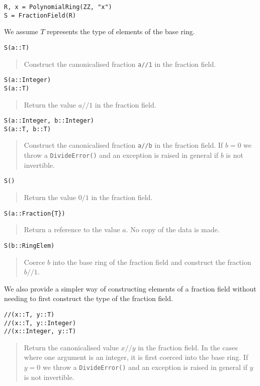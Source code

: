 \documentclass[a4paper,10pt]{article}
\newcommand{\code}{\lstinline}
\newcommand{\desc}[1]{\vspace{-3mm}\begin{quote}#1\end{quote}}
\begin{document}
\begin{lstlisting}
R, x = PolynomialRing(ZZ, "x")
S = FractionField(R)
\end{lstlisting}

We assume $T$ represents the type of elements of the base ring.

\begin{lstlisting}
S(a::T)
\end{lstlisting}

\desc{Construct the canonicalised fraction \code{a//1} in the fraction field.}

\begin{lstlisting}
S(a::Integer)
S(a::T)
\end{lstlisting}

\desc{Return the value $a//1$ in the fraction field.}

\begin{lstlisting}
S(a::Integer, b::Integer)
S(a::T, b::T)
\end{lstlisting}

\desc{Construct the canonicalised fraction \code{a//b} in the fraction field. If
$b = 0$ we throw a \code{DivideError()} and an exception is raised in general
if $b$ is not invertible.}

\begin{lstlisting}
S()
\end{lstlisting}

\desc{Return the value $0/1$ in the fraction field.}

\begin{lstlisting}
S(a::Fraction{T})
\end{lstlisting}

\desc{Return a reference to the value $a$. No copy of the data is made.}

\begin{lstlisting}
S(b::RingElem)
\end{lstlisting}

\desc{Coerce $b$ into the base ring of the fraction field and construct the
fraction $b//1$.}

We also provide a simpler way of constructing elements of a fraction field
without needing to first construct the type of the fraction field. 

\begin{lstlisting}
//(x::T, y::T)
//(x::T, y::Integer)
//(x::Integer, y::T)
\end{lstlisting}

\desc{Return the canonicalised value $x//y$ in the fraction field. In the cases
where one argument is an integer, it is first coerced into the base ring. If
$y = 0$ we throw a \code{DivideError()} and an exception is raised in general
if $y$ is not invertible.}
\end{document}
